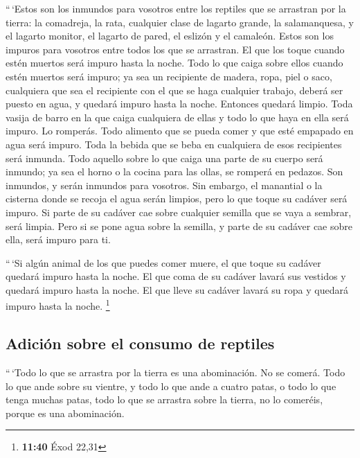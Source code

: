 \begin{paracol}{2}
 ``\,`Estos son los inmundos para vosotros entre los
reptiles que se arrastran por la tierra: la comadreja, la rata,
cualquier clase de lagarto grande,  la salamanquesa, y el
lagarto monitor, el lagarto de pared, el eslizón y el camaleón.
 Estos son los impuros para vosotros entre todos los que
se arrastran. El que los toque cuando estén muertos será impuro hasta la
noche.  Todo lo que caiga sobre ellos cuando estén
muertos será impuro; ya sea un recipiente de madera, ropa, piel o saco,
cualquiera que sea el recipiente con el que se haga cualquier trabajo,
deberá ser puesto en agua, y quedará impuro hasta la noche. Entonces
quedará limpio.  Toda vasija de barro en la que caiga
cualquiera de ellas y todo lo que haya en ella será impuro. Lo romperás.
 Todo alimento que se pueda comer y que esté empapado en
agua será impuro. Toda la bebida que se beba en cualquiera de esos
recipientes será inmunda.  Todo aquello sobre lo que
caiga una parte de su cuerpo será inmundo; ya sea el horno o la cocina
para las ollas, se romperá en pedazos. Son inmundos, y serán inmundos
para vosotros.  Sin embargo, el manantial o la cisterna
donde se recoja el agua serán limpios, pero lo que toque su cadáver será
impuro.  Si parte de su cadáver cae sobre cualquier
semilla que se vaya a sembrar, será limpia.  Pero si se
pone agua sobre la semilla, y parte de su cadáver cae sobre ella, será
impuro para ti.

 ``\,`Si algún animal de los que puedes comer muere, el
que toque su cadáver quedará impuro hasta la noche.  El
que coma de su cadáver lavará sus vestidos y quedará impuro hasta la
noche. El que lleve su cadáver lavará su ropa y quedará impuro hasta la
noche. \footnote{\textbf{11:40} Éxod 22,31}

\hypertarget{adiciuxf3n-sobre-el-consumo-de-reptiles}{%
\subsection{Adición sobre el consumo de
reptiles}\label{adiciuxf3n-sobre-el-consumo-de-reptiles}}

 ``\,`Todo lo que se arrastra por la tierra es una
abominación. No se comerá.  Todo lo que ande sobre su
vientre, y todo lo que ande a cuatro patas, o todo lo que tenga muchas
patas, todo lo que se arrastra sobre la tierra, no lo comeréis, porque
es una abominación.


\end{paracol}
